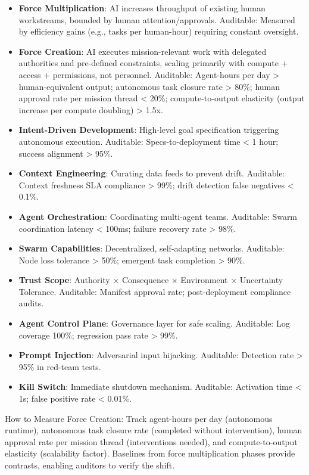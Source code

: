 \documentclass[11pt]{article}
\begin{document}
\begin{itemize}
\item
  \textbf{Force Multiplication}: AI increases throughput of existing human workstreams, bounded by human attention/approvals. Auditable: Measured by efficiency gains (e.g., tasks per human-hour) requiring constant oversight.
\item
  \textbf{Force Creation}: AI executes mission-relevant work with delegated authorities and pre-defined constraints, scaling primarily with compute + access + permissions, not personnel. Auditable: Agent-hours per day \textgreater{} human-equivalent output; autonomous task closure rate \textgreater{} 80\%; human approval rate per mission thread \textless{} 20\%; compute-to-output elasticity (output increase per compute doubling) \textgreater{} 1.5x.
\item
  \textbf{Intent-Driven Development}: High-level goal specification triggering autonomous execution. Auditable: Specs-to-deployment time \textless{} 1 hour; success alignment \textgreater{} 95\%.
\item
  \textbf{Context Engineering}: Curating data feeds to prevent drift. Auditable: Context freshness SLA compliance \textgreater{} 99\%; drift detection false negatives \textless{} 0.1\%.
\item
  \textbf{Agent Orchestration}: Coordinating multi-agent teams. Auditable: Swarm coordination latency \textless{} 100ms; failure recovery rate \textgreater{} 98\%.
\item
  \textbf{Swarm Capabilities}: Decentralized, self-adapting networks. Auditable: Node loss tolerance \textgreater{} 50\%; emergent task completion \textgreater{} 90\%.
\item
  \textbf{Trust Scope}: Authority $\times$ Consequence $\times$ Environment $\times$ Uncertainty Tolerance. Auditable: Manifest approval rate; post-deployment compliance audits.
\item
  \textbf{Agent Control Plane}: Governance layer for safe scaling. Auditable: Log coverage 100\%; regression pass rate \textgreater{} 99\%.
\item
  \textbf{Prompt Injection}: Adversarial input hijacking. Auditable: Detection rate \textgreater{} 95\% in red-team tests.
\item
  \textbf{Kill Switch}: Immediate shutdown mechanism. Auditable: Activation time \textless{} 1s; false positive rate \textless{} 0.01\%.
\end{itemize}

How to Measure Force Creation: Track agent-hours per day (autonomous runtime), autonomous task closure rate (completed without intervention), human approval rate per mission thread (interventions needed), and compute-to-output elasticity (scalability factor). Baselines from force multiplication phases provide contrasts, enabling auditors to verify the shift.
\end{document}
